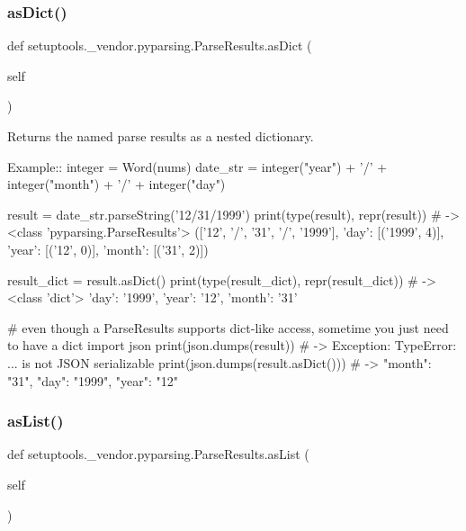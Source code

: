 \subsubsection{\texorpdfstring{as\+Dict()}{asDict()}}
{\footnotesize\ttfamily def setuptools.\+\_\+vendor.\+pyparsing.\+Parse\+Results.\+as\+Dict (\begin{DoxyParamCaption}\item[{}]{self }\end{DoxyParamCaption})}

\begin{DoxyVerb}Returns the named parse results as a nested dictionary.

Example::
    integer = Word(nums)
    date_str = integer("year") + '/' + integer("month") + '/' + integer("day")
    
    result = date_str.parseString('12/31/1999')
    print(type(result), repr(result)) # -> <class 'pyparsing.ParseResults'> (['12', '/', '31', '/', '1999'], {'day': [('1999', 4)], 'year': [('12', 0)], 'month': [('31', 2)]})
    
    result_dict = result.asDict()
    print(type(result_dict), repr(result_dict)) # -> <class 'dict'> {'day': '1999', 'year': '12', 'month': '31'}

    # even though a ParseResults supports dict-like access, sometime you just need to have a dict
    import json
    print(json.dumps(result)) # -> Exception: TypeError: ... is not JSON serializable
    print(json.dumps(result.asDict())) # -> {"month": "31", "day": "1999", "year": "12"}
\end{DoxyVerb}
 \mbox{\label{classsetuptools_1_1__vendor_1_1pyparsing_1_1ParseResults_a8d1cc9ef72b2fcf972c240eae0e59e87}} 
\subsubsection{\texorpdfstring{as\+List()}{asList()}}
{\footnotesize\ttfamily def setuptools.\+\_\+vendor.\+pyparsing.\+Parse\+Results.\+as\+List (\begin{DoxyParamCaption}\item[{}]{self }\end{DoxyParamCaption})}

